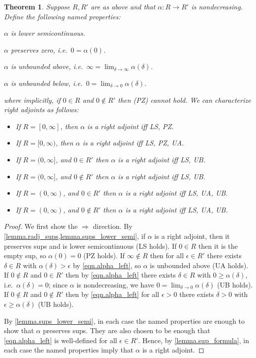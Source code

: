 \documentclass[11pt, one side, article]{memoir}
\theoremstyle{definition}
\theoremstyle{plain}
\newtheorem{theorem}[definitionx]{Theorem}
\begin{document}
\begin{theorem}
Suppose $R,R'$ are as above and that $\alpha\colon R\to R'$ is nondecreasing. Define the following named properties:
\begin{description}[leftmargin=\parindent,labelindent=\parindent]
	\item[LS:] $\alpha$ is lower semicontinuous.
	\item[PZ:] $\alpha$ preserves zero, i.e.\ $0=\alpha(0)$.
	\item[UA:] $\alpha$ is unbounded above, i.e.\ $\infty=\lim_{\delta\to\infty}\alpha(\delta)$.
	\item[UB:] $\alpha$ is unbounded below, i.e.\ $0=\lim_{\delta\to0}\alpha(\delta)$.
\end{description}
where implicitly, if $0\in R$ and $0\not\in R'$ then (PZ) cannot hold. We can characterize right adjoints as follows:
\begin{itemize}
	\item If $R=[0,\infty]$, then $\alpha$ is a right adjoint iff LS, PZ.
	\item If $R=[0,\infty)$, then $\alpha$ is a right adjoint iff LS, PZ, UA.
	\item If $R=(0,\infty]$, and $0\in R'$ then $\alpha$ is a right adjoint iff LS, UB.
	\item If $R=(0,\infty]$, and $0\not\in R'$ then $\alpha$ is a right adjoint iff LS, UB.
	\item If $R=(0,\infty)$, and $0\in R'$ then $\alpha$ is a right adjoint iff LS, UA, UB.
	\item If $R=(0,\infty)$, and $0\not\in R'$ then $\alpha$ is a right adjoint iff LS, UA, UB.
\end{itemize}
\end{theorem}
\begin{proof}
We first show the $\Rightarrow$ direction. By \cref{lemma.radj_sups,lemma.sups_lower_semi}, if $\alpha$ is a right adjoint, then it preserves sups and is lower semicontinuous (LS holds). If $0\in R$ then it is the empty sup, so $\alpha(0)=0$ (PZ holds). If $\infty\not\in R$ then for all $\epsilon\in R'$ there exists $\delta\in R$ with $\alpha(\delta)>\epsilon$ by \eqref{eqn.alpha_left}, so $\alpha$ is unbounded above (UA holds). If $0\not\in R$ and $0\in R'$ then by \eqref{eqn.alpha_left} there exists $\delta\in R$ with $0\geq\alpha(\delta)$, i.e.\ $\alpha(\delta)=0$; since $\alpha$ is nondecreasing, we have $0=\lim_{\delta\to 0}\alpha(\delta)$ (UB holds). If $0\not\in R$ and $0\not\in R'$ then by \eqref{eqn.alpha_left} for all $\epsilon>0$ there exists $\delta>0$ with $\epsilon\geq\alpha(\delta)$ (UB holds).

By \cref{lemma.sups_lower_semi}, in each case the named properties are enough to show that $\alpha$ preserves sups. They are also chosen to be enough that \eqref{eqn.alpha_left} is well-defined for all $\epsilon\in R'$. Hence, by \cref{lemma.sup_formula}, in each case the named properties imply that $\alpha$ is a right adjoint.
\end{proof}
\end{document}
